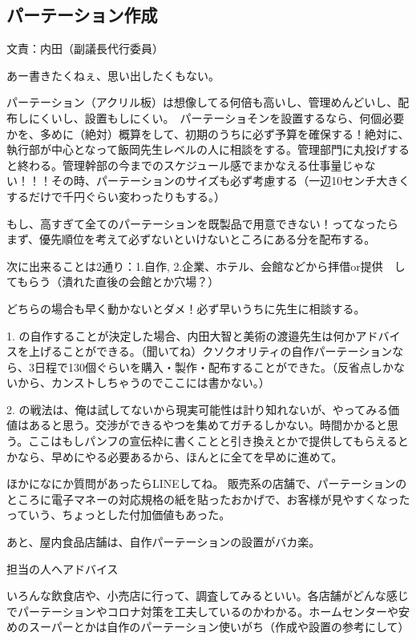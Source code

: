 \documentclass[dvipdfmx,jb5]{jreport}
\begin{document}
\subsection{パーテーション作成} 文責：内田（副議長代行委員） \vspace{2mm}

あー書きたくねぇ、思い出したくもない。

パーテーション（アクリル板）は想像してる何倍も高いし、管理めんどいし、配布しにくいし、設置もしにくい。　パーテーショそンを設置するなら、何個必要かを、多めに（絶対）概算をして、初期のうちに必ず予算を確保する！絶対に、執行部が中心となって飯岡先生レベルの人に相談をする。管理部門に丸投げすると終わる。管理幹部の今までのスケジュール感でまかなえる仕事量じゃない！！！その時、パーテーションのサイズも必ず考慮する（一辺10センチ大きくするだけで千円ぐらい変わったりもする。）

もし、高すぎて全てのパーテーションを既製品で用意できない！ってなったら
まず、優先順位を考えて必ずないといけないところにある分を配布する。

次に出来ることは2通り：1.自作, 2.企業、ホテル、会館などから拝借or提供　してもらう（潰れた直後の会館とか穴場？）

どちらの場合も早く動かないとダメ！必ず早いうちに先生に相談する。

1. の自作することが決定した場合、内田大智と美術の渡邉先生は何かアドバイスを上げることができる。（聞いてね）クソクオリティの自作パーテーションなら、3日程で130個ぐらいを購入・製作・配布することができた。（反省点しかないから、カンストしちゃうのでここには書かない。）

2. の戦法は、俺は試してないから現実可能性は計り知れないが、やってみる価値はあると思う。交渉ができるやつを集めてガチるしかない。時間かかると思う。ここはもしパンフの宣伝枠に書くことと引き換えとかで提供してもらえるとかなら、早めにやる必要あるから、ほんとに全てを早めに進めて。

ほかになにか質問があったらLINEしてね。
販売系の店舗で、パーテーションのところに電子マネーの対応規格の紙を貼ったおかげで、お客様が見やすくなったっていう、ちょっとした付加価値もあった。

あと、屋内食品店舗は、自作パーテーションの設置がバカ楽。

担当の人へアドバイス

いろんな飲食店や、小売店に行って、調査してみるといい。各店舗がどんな感じでパーテーションやコロナ対策を工夫しているのかわかる。ホームセンターや安めのスーパーとかは自作のパーテーション使いがち（作成や設置の参考にして）
\end{document}
